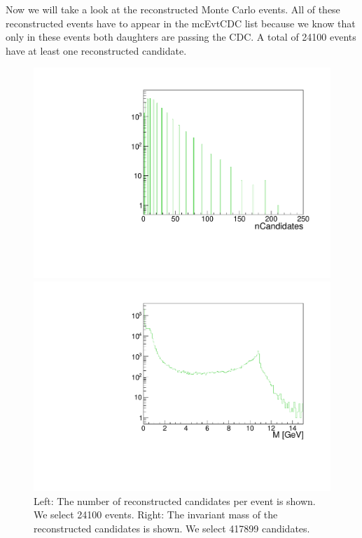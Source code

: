 \documentclass[a4paper,11pt,twosided,final,german,openbib,pdftex,listof=totoc,bibliography=totoc]{scrbook}
\begin{document}
Now we will take a look at the reconstructed Monte Carlo events. All of these reconstructed events have to appear in the mcEvtCDC list because we know that only in these events both daughters are passing the CDC. A total of 24100 events have at least one reconstructed candidate.


\begin{figure}[h!]
	\centering
	\begin{minipage}[b]{0.45\linewidth}
		\centering
		\includegraphics[width=\textwidth]{Cuts/nCandAll.pdf}
	\end{minipage}
	\hspace{0.5cm}
	\begin{minipage}[b]{0.45\linewidth}
		\centering
		\includegraphics[width=\textwidth]{Cuts/Mall.pdf}
	\end{minipage}
	\caption[Number Of Candidates And Invariant Mass (No Cuts)]{Left: The number of reconstructed candidates per event is shown. We select 24100 events.
		Right: The invariant mass of the reconstructed candidates is shown. We select 417899 candidates.}
	\label{fig:nCandAll}
\end{figure}
\end{document}
